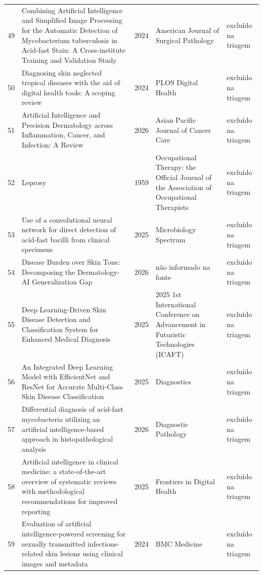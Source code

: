 \begin{longtable}{@{}lp{6.4cm}lp{3.1cm}p{3.2cm}@{}}
\hypertarget{estudo:49}{49} & Combining Artificial Intelligence and Simplified Image Processing for the Automatic Detection of Mycobacterium tuberculosis in Acid-fast Stain: A Cross-institute Training and Validation Study & 2024 & American Journal of Surgical Pathology & exclu\'ido na triagem \\
\hypertarget{estudo:50}{50} & Diagnosing skin neglected tropical diseases with the aid of digital health tools: A scoping review & 2024 & PLOS Digital Health & exclu\'ido na triagem \\
\hypertarget{estudo:51}{51} & Artificial Intelligence and Precision Dermatology across Inflammation, Cancer, and Infection: A Review & 2026 & Asian Pacific Journal of Cancer Care & exclu\'ido na triagem \\
\hypertarget{estudo:52}{52} & Leprosy & 1959 & Occupational Therapy: the Official Journal of the Association of Occupational Therapists & exclu\'ido na triagem \\
\hypertarget{estudo:53}{53} & Use of a convolutional neural network for direct detection of acid-fast bacilli from clinical specimens & 2025 & Microbiology Spectrum & exclu\'ido na triagem \\
\hypertarget{estudo:54}{54} & Disease Burden over Skin Tone: Decomposing the Dermatology-AI Generalization Gap & 2026 & não informado na fonte & exclu\'ido na triagem \\
\hypertarget{estudo:55}{55} & Deep Learning-Driven Skin Disease Detection and Classification System for Enhanced Medical Diagnosis & 2025 & 2025 1st International Conference on Advancement in Futuristic Technologies (ICAFT) & exclu\'ido na triagem \\
\hypertarget{estudo:56}{56} & An Integrated Deep Learning Model with EfficientNet and ResNet for Accurate Multi-Class Skin Disease Classification & 2025 & Diagnostics & exclu\'ido na triagem \\
\hypertarget{estudo:57}{57} & Differential diagnosis of acid-fast mycobacteria utilizing an artificial intelligence-based approach in histopathological analysis & 2026 & Diagnostic Pathology & exclu\'ido na triagem \\
\hypertarget{estudo:58}{58} & Artificial intelligence in clinical medicine: a state-of-the-art overview of systematic reviews with methodological recommendations for improved reporting & 2025 & Frontiers in Digital Health & exclu\'ido na triagem \\
\hypertarget{estudo:59}{59} & Evaluation of artificial intelligence-powered screening for sexually transmitted infections-related skin lesions using clinical images and metadata & 2024 & BMC Medicine & exclu\'ido na triagem \\

\end{longtable}
